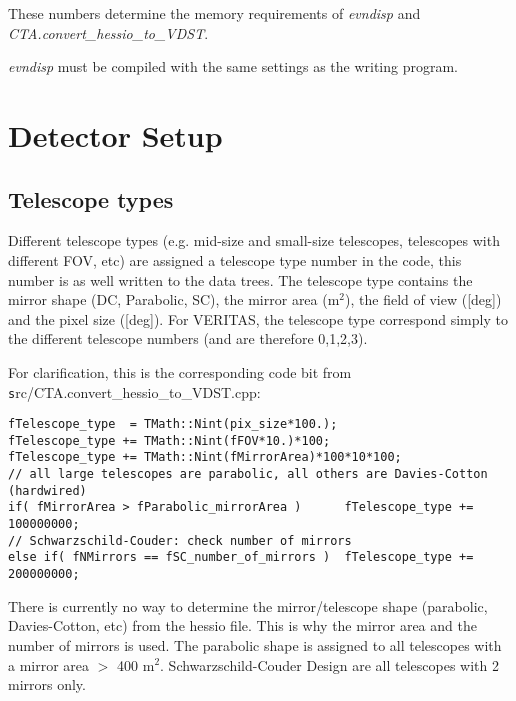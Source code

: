 \documentclass[titlepage,a4paper,twoside,11pt]{report}
\begin{document}
 These numbers determine the memory requirements of {\it evndisp} and {\it CTA.convert\_hessio\_to\_VDST}.

 {\it evndisp} must be compiled with the same settings as the writing program.


\chapter{Detector Setup}


\section{Telescope types}

Different telescope types (e.g. mid-size and small-size telescopes, telescopes with different FOV, etc) are assigned a telescope type number in the code, this number is as well written to the data trees. The telescope type  contains the mirror shape (DC, Parabolic, SC), the mirror area (m$^2$), the field of view ([deg]) and the pixel size ([deg]). For VERITAS, the telescope type correspond simply to the different telescope numbers (and are therefore 0,1,2,3).

For clarification, this is the corresponding code bit from {\texttt src/CTA.convert\_hessio\_to\_VDST.cpp}:

\begin{lstlisting}
fTelescope_type  = TMath::Nint(pix_size*100.);
fTelescope_type += TMath::Nint(fFOV*10.)*100;
fTelescope_type += TMath::Nint(fMirrorArea)*100*10*100;
// all large telescopes are parabolic, all others are Davies-Cotton (hardwired)
if( fMirrorArea > fParabolic_mirrorArea )      fTelescope_type += 100000000;
// Schwarzschild-Couder: check number of mirrors
else if( fNMirrors == fSC_number_of_mirrors )  fTelescope_type += 200000000;
\end{lstlisting}

 There is currently no way to determine the mirror/telescope shape (parabolic, Davies-Cotton, etc) from the hessio file. This is why the mirror area and the number of mirrors is used. 
The parabolic shape is assigned to all telescopes with a mirror area  $>$ 400 m$^2$.
Schwarzschild-Couder Design are all telescopes with 2 mirrors only.

\end{document}
